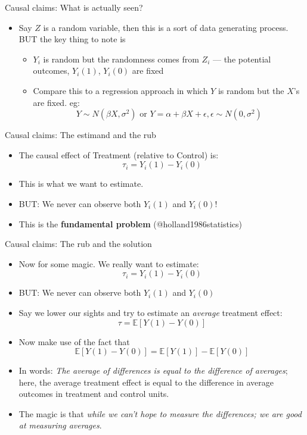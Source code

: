 \documentclass[
  11pt,
  ignorenonframetext,
]{beamer}
\providecommand{\tightlist}{%
  \setlength{\itemsep}{0pt}\setlength{\parskip}{0pt}}\usepackage{longtable,booktabs,array}
\begin{document}
\begin{frame}{Causal claims: What is actually seen?}
\protect\hypertarget{causal-claims-what-is-actually-seen-1}{}
\begin{itemize}
\item
  Say \(Z\) is a random variable, then this is a sort of data generating
  process. BUT the key thing to note is

  \begin{itemize}
  \tightlist
  \item
    \(Y_i\) is random but the randomness comes from \(Z_i\) --- the
    potential outcomes, \(Y_i(1)\), \(Y_i(0)\) are fixed
  \item
    Compare this to a regression approach in which \(Y\) is random but
    the \(X\)'s are fixed. eg:
    \[ Y \sim N(\beta X, \sigma^2) \text{ or }  Y=\alpha+\beta X+\epsilon, \epsilon\sim N(0, \sigma^2) \]
  \end{itemize}
\end{itemize}
\end{frame}

\begin{frame}{Causal claims: The estimand and the rub}
\protect\hypertarget{causal-claims-the-estimand-and-the-rub}{}
\begin{itemize}
\tightlist
\item
  The causal effect of Treatment (relative to Control) is:
  \[\tau_i = Y_i(1) - Y_i(0)\]
\item
  This is what we want to estimate.
\item
  BUT: We never can observe both \(Y_i(1)\) and \(Y_i(0)\)!
\item
  This is the \textbf{fundamental problem} (@holland1986statistics)
\end{itemize}
\end{frame}

\begin{frame}{Causal claims: The rub and the solution}
\protect\hypertarget{causal-claims-the-rub-and-the-solution}{}
\begin{itemize}
\item
  Now for some magic. We really want to estimate:
  \[ \tau_i = Y_i(1) - Y_i(0)\]
\item
  BUT: We never can observe both \(Y_i(1)\) and \(Y_i(0)\)
\item
  Say we lower our sights and try to estimate an \emph{average}
  treatment effect: \[ \tau = \mathbb{E} [Y(1)-Y(0)]\]
\item
  Now make use of the fact that
  \[\mathbb E[Y(1)-Y(0)]  = \mathbb E[Y(1)]- \mathbb E [Y(0)] \]
\item
  In words: \emph{The average of differences is equal to the difference
  of averages}; here, the average treatment effect is equal to the
  difference in average outcomes in treatment and control units.
\item
  The magic is that \emph{while we can't hope to measure the
  differences; we are good at measuring averages}.
\end{itemize}
\end{frame}
\end{document}
